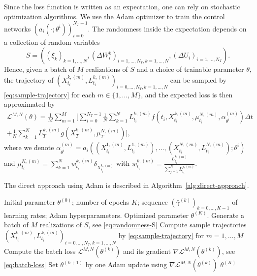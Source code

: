 \documentclass[11pt]{article}
\numberwithin{equation}{section}
\theoremstyle{plain}
\theoremstyle{definition}
\theoremstyle{remark}
\begin{document}
	Since the loss function is written as an expectation, one can rely on stochastic optimization algorithms. We use the Adam optimizer to train the control networks $(a_i(\cdot; \theta^i))_{i=0}^{N_T-1}$. The randomness inside the expectation depends on a collection of random variables 
	\begin{equation} \label{eq:randomness-S}
		S = \left((\xi_k)_{k=1,\dots, N}, (\Delta W_i^k)_{i=1, \dots, N_T, k=1,\dots, N},(\Delta U_i)_{i=1,\dots,N_T}\right).
	\end{equation}
	Hence, given a batch of $M$ realizations of $S$ and a choice of trainable parameter $\theta$, the trajectory of $(X^{k, (m)}_{t_i}, L^{k, (m)}_{t_i})_{i=0, \dots, N_T, k=1,\dots, N}$ can be sampled by \eqref{eq:sample-trajectory} for each $m \in \{1,\dots, M\}$, and the expected loss is then approximated by 
	\begin{equation}\label{eq:batch-loss}
		\begin{aligned} 
			\mathcal{L}^{M,N}(\theta) = \frac{1}{M}\sum_{m=1}^M \bigg[ \sum_{i=0}^{N_T-1} \frac{1}{N}\sum_{k=1}^N L_{t_i}^{k, (m)} f\left(t_i, X_{t_i}^{k, (m)}, \mu_{t_i}^{N, (m)}, \alpha_{\theta^i}^{(m)}\right) \Delta t \\
			+ \frac{1}{N}\sum_{k=1}^N L_T^{k, (m)} g(X_T^{k, (m)}, \mu_T^{N, (m)}) \bigg], 
		\end{aligned}
	\end{equation}
	where we denote $\alpha_{\theta^i}^{(m)} = a_i\left( (X_{t_i}^{1, (m)}, L_{t_i}^{1, (m)}), \dots, (X_{t_i}^{N, (m)}, L_{t_i}^{N, (m)}); \theta^i\right)$ and $\mu_{t_i}^{N, (m)} = \sum_{k=1}^N w_{t_i}^{k,(m)} \delta_{X_{t_i}^{k, (m)}}$ with $w_{t_i}^{k, (m)} = \frac{L_{t_i}^{k, (m)}}{\sum_{j=1}^N L_{t_i}^{j, (m)}}$. 
	
	The direct approach using Adam is described in Algorithm~\ref{alg:direct-approach}. 
	\begin{algorithm}[ht]
		\caption{Direct approach using Adam}
		\label{alg:direct-approach}
		\begin{algorithmic}[1]
			\REQUIRE Initial parameter $\theta^{(0)}$; number of epochs $K$; sequence $(\bar{\gamma}^{(k)})_{k=0,\dots, K-1}$ of learning rates; Adam hyperparameters.
			\ENSURE Optimized parameter $\theta^{(K)}$. 
			\STATE Generate a batch of $M$ realizations of $S$, see \eqref{eq:randomness-S} 
			\STATE Compute sample trajectories $(X^{k, (m)}_{t_i}, L^{k, (m)}_{t_i})_{i=0, \dots, N_T, k=1,\dots, N}$ by \eqref{eq:sample-trajectory} for $m=1,\dots, M$ 
			\STATE Compute the batch loss $\mathcal{L}^{M,N}(\theta^{(k)})$ and its gradient $\nabla \mathcal{L}^{M,N}(\theta^{(k)})$, see \eqref{eq:batch-loss} 
			\STATE Set $\theta^{(k+1)}$ by one Adam update using $\nabla \mathcal{L}^{M,N}(\theta^{(k)})$ 
			\ENDFOR
			\RETURN $\theta^{(K)}$   
		\end{algorithmic}
	\end{algorithm}
	
\end{document}
